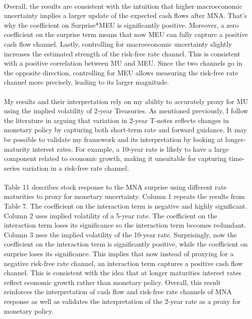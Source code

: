 \documentclass[12pt]{article}
\begin{document}
\paragraph{}
Overall, the results are consistent with the intuition that higher macroeconomic uncertainty implies a larger update of the expected cash flows after MNA. That's why the coefficient on Surprise*MEU is significantly positive. Moreover, a zero coefficient on the surprise term means that now MEU can fully capture a positive cash flow channel. Lastly, controlling for macroeconomic uncertainty slightly increases the estimated strength of the risk-free rate channel. This is consistent with a positive correlation between MU and MEU. Since the two channels go in the opposite direction, controlling for MEU allows measuring the risk-free rate channel more precisely, leading to its larger magnitude. 
\paragraph{}
My results and their interpretation rely on my ability to accurately proxy for MU using the implied volatility of 2-year Treasuries. As mentioned previously, I follow the literature in arguing that variation in 2-year T-notes reflects changes in monetary policy by capturing both short-term rate and forward guidance. It may be possible to validate my framework and its interpretation by looking at longer-maturity interest rates. For example, a 10-year rate is likely to have a large component related to economic growth, making it unsuitable for capturing time-series variation in a risk-free rate channel.
\paragraph{}
Table 11 describes stock response to the MNA surprise using different rate maturities to proxy for monetary uncertainty. Column 1 repeats the results from Table 7. The coefficient on the interaction term is negative and highly significant. Column 2 uses implied volatility of a 5-year rate. The coefficient on the interaction term loses its significance so the interaction term becomes redundant. Column 3 uses the implied volatility of the 10-year rate. Surprisingly, now the coefficient on the interaction term is significantly positive, while the coefficient on surprise loses its significance. This implies that now instead of proxying for a negative risk-free rate channel, an interaction term captures a positive cash flow channel. This is consistent with the idea that at longer maturities interest rates reflect economic growth rather than monetary policy. Overall, this result reinforces the interpretation of cash flow and risk-free rate channels of MNA response as well as validates the interpretation of the 2-year rate as a proxy for monetary policy.
\end{document}
